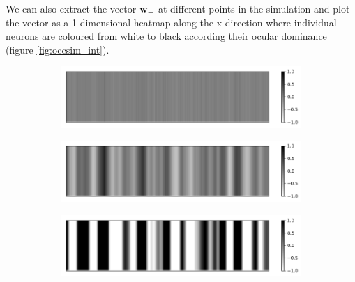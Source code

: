 \documentclass{article}
\begin{document}
We can also extract the vector ${\bf w}_-$ at different points in the simulation and plot the vector as a 1-dimensional heatmap along the x-direction where individual neurons are coloured from white to black according their ocular dominance (figure \ref{fig:occsim_int}).


\begin{figure}[h]
	\centering
	\begin{subfigure}[t]{0.60\linewidth}
		\centering
		\includegraphics[width = 1.0\linewidth, trim={0 0 0 0}, clip=true]{figures/occsim_int/i50.png}
	\end{subfigure}%
	\hspace{0.03\linewidth}
	\begin{subfigure}[t]{0.60\linewidth}
		\centering
		\includegraphics[width = 1.0\linewidth, trim={0 0 0 0}, clip=true]{figures/occsim_int/i200.png}
	\end{subfigure}%
	\hspace{0.03\linewidth}
	\begin{subfigure}[t]{0.60\linewidth}
		\centering
		\includegraphics[width = 1.0\linewidth, trim={0 0 0 0}, clip=true]{figures/occsim_int/i300.png}
	\end{subfigure}%
	\hspace{0.03\linewidth}
	\begin{subfigure}[t]{0.60\linewidth}

\end{subfigure}
\end{figure}
\end{document}
